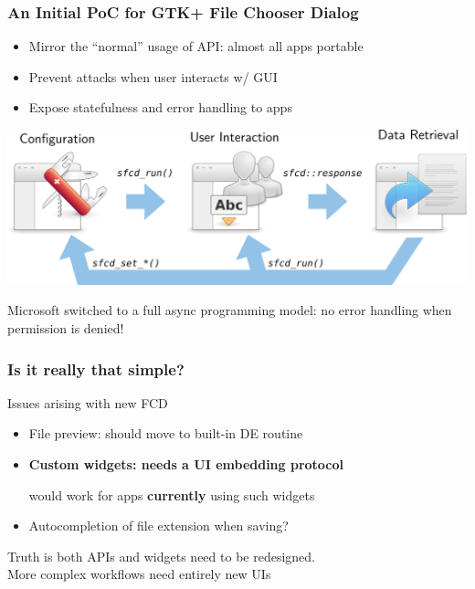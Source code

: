 \begin{frame}
\frametitle{An Initial PoC for GTK+ File Chooser Dialog}
      
  \begin{itemize}
  \item Mirror the ``normal'' usage of API: almost all apps portable
  \item Prevent attacks when user interacts w/ GUI
  \item Expose statefulness and error handling to apps
  \end{itemize}

\includegraphics[height=0.45\textheight]{figures/sfcd-states.jpg}

\begin{important}
Microsoft switched to a full async programming model: no error handling when permission is denied!
\end{important}
\end{frame}


\begin{frame}
\frametitle{Is it really that simple?}

  \begin{block}{Issues arising with new FCD}
  \begin{itemize}
  \item File preview: should move to built-in DE routine
  \item \textbf{Custom widgets: needs a UI embedding protocol}
    {\scriptsize \begin{flushright}would work for apps \textbf{currently} using such widgets\end{flushright}}
  \item Autocompletion of file extension when saving?
  \end{itemize}
  \end{block}
  
  \begin{important}
  Truth is both APIs and widgets need to be redesigned.\\
  More complex workflows need entirely new UIs
  \end{important}
\end{frame}


